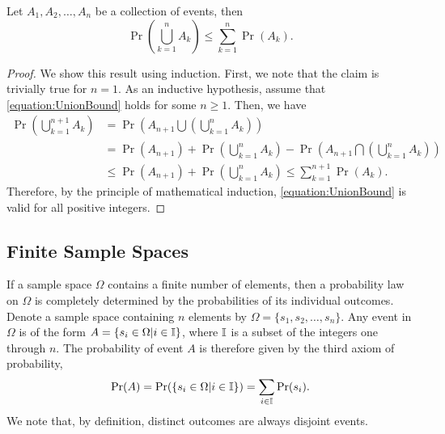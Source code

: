 \begin{theorem}
Let $A_1, A_2, \ldots, A_n$ be a collection of events, then
\begin{equation} \label{equation:UnionBound}
\Pr \left( \bigcup_{k=1}^{n} A_k \right)
\leq \sum_{k = 1}^{n} \Pr (A_k) .
\end{equation}
\end{theorem}
\begin{proof}
We show this result using induction.
First, we note that the claim is trivially true for $n = 1$.
As an inductive hypothesis, assume that \eqref{equation:UnionBound} holds for some $n \geq 1$.
Then, we have
\begin{equation*}
\begin{split}
\Pr \left( \bigcup_{k=1}^{n+1} A_k \right)
&= \Pr \left( A_{n+1} \bigcup \left( \bigcup_{k=1}^{n} A_k \right) \right) \\
&= \Pr (A_{n+1}) + \Pr \left( \bigcup_{k=1}^{n} A_k \right)
- \Pr \left( A_{n+1} \bigcap \left( \bigcup_{k=1}^{n} A_k \right) \right) \\
&\leq \Pr (A_{n+1}) + \Pr \left( \bigcup_{k=1}^{n} A_k \right)
\leq \sum_{k = 1}^{n+1} \Pr (A_k) .
\end{split}
\end{equation*}
Therefore, by the principle of mathematical induction, \eqref{equation:UnionBound} is valid for all positive integers.
\end{proof}


\subsection{Finite Sample Spaces}
\label{section:FiniteSampleSpaces}

If a sample space $\Omega$ contains a finite number of elements, then a probability law on $\Omega$ is completely determined by the probabilities of its individual outcomes.
Denote a sample space containing $n$ elements by $\Omega = \{ s_1, s_2, \ldots, s_n \}$.
Any event in $\Omega$ is of the form $A = \{ s_i \in \Omega | i \in \mathbb{I} \}$, where $\mathbb{I}$ is a subset of the integers one through $n$.
The probability of event $A$ is therefore given by the third axiom of probability,
\begin{equation*}
\Pr (A)
= \Pr ( \{ s_i \in \Omega | i \in \mathbb{I} \} )
= \sum_{i \in \mathbb{I}} \Pr (s_i) .
\end{equation*}
We note that, by definition, distinct outcomes are always disjoint events.

